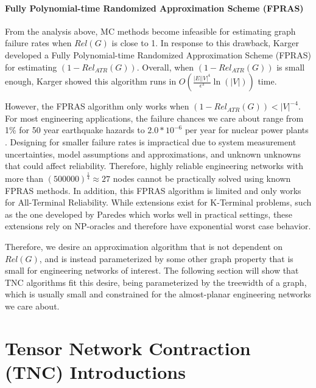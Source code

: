 \hypertarget{fully-polynomial-time-randomized-approximation-scheme-fpras}{%
\paragraph{\texorpdfstring{Fully Polynomial-time Randomized Approximation Scheme (FPRAS)\\
}{Fully Polynomial-time Randomized Approximation Scheme (FPRAS) }}\label{fully-polynomial-time-randomized-approximation-scheme-fpras}}

From the analysis above, MC methods become infeasible for estimating graph failure rates when \(Rel(G)\) is close to 1. In response to this drawback, Karger \cite{karger2001randomized} developed a Fully Polynomial-time Randomized Approximation Scheme (FPRAS) for estimating \((1-Rel_{ATR}(G))\). Overall, when \((1-Rel_{ATR}(G))\) is small enough, Karger showed this algorithm runs in \(O(\frac{|E||V|^4}{\epsilon^3}\ln(|V|))\) time.

However, the FPRAS algorithm only works when \((1-Rel_{ATR}(G))<|V|^{-4}\). For most engineering applications, the failure chances we care about range from 1\% for 50 year earthquake hazards \cite{IBC_2017} to \(2.0*10^{-6}\) per year for nuclear power plants \cite{NRC_2010}. Designing for smaller failure rates is impractical due to system measurement uncertainties, model assumptions and approximations, and unknown unknowns that could affect reliability. Therefore, highly reliable engineering networks with more than \((500000)^{\frac{1}{4}} \approx 27\) nodes cannot be practically solved using known FPRAS methods. In addition, this FPRAS algorithm is limited and only works for All-Terminal Reliability. While extensions exist for K-Terminal problems, such as the one developed by Paredes \cite{paredes2019principled} which works well in practical settings, these extensions rely on NP-oracles and therefore have exponential worst case behavior.

Therefore, we desire an approximation algorithm that is not dependent on \(Rel(G)\), and is instead parameterized by some other graph property that is small for engineering networks of interest. The following section will show that TNC algorithms fit this desire, being parameterized by the treewidth of a graph, which is usually small and constrained for the almost-planar engineering networks we care about.

\hypertarget{tensor-network-contraction-tnc-introductions}{%
\section{Tensor Network Contraction (TNC) Introductions}\label{tensor-network-contraction-tnc-introductions}}

